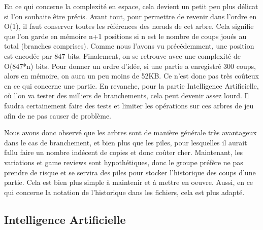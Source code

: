 \documentclass{article}
\begin{document}
En ce qui concerne la complexité en espace, cela devient un petit peu plus délicat si l'on souhaite être précis. Avant tout, pour permettre de
revenir dans l'ordre en O(1), il faut conserver toutes les références des nœuds de cet arbre. Cela signifie que l'on garde en mémoire n+1 positions 
si n est le nombre de coups joués au total (branches comprises). Comme nous l'avons vu précédemment, une position est encodée par 847 bits.
Finalement, on se retrouve avec une complexité de O(847*n) bits. Pour donner un ordre d'idée, si une partie a enregistré 300 coups, alors en mémoire,
on aura un peu moins de 52KB. Ce n'est donc pas très coûteux en ce qui concerne une partie. En revanche, pour la partie Intelligence Artificielle,
où l'on va tester des milliers de branchements, cela peut devenir assez lourd. Il faudra certainement faire des tests et limiter les opérations
sur ces arbres de jeu afin de ne pas causer de problème.

\par Nous avons donc observé que les arbres sont de manière générale très avantageux dans le cas de branchement, et bien plus que les piles, pour lesquelles
il aurait fallu faire un nombre indécent de copies et donc coûter cher.
Maintenant, les variations et game reviews sont hypothétiques, donc le groupe préfère ne pas prendre de risque et se servira des piles pour stocker
l'historique des coups d'une partie. Cela est bien plus simple à maintenir et à mettre en oeuvre. Aussi, en ce qui concerne la notation de l'historique
dans les fichiers, cela est plus adapté.

\subsection{Intelligence Artificielle} \label{AI}
\end{document}
